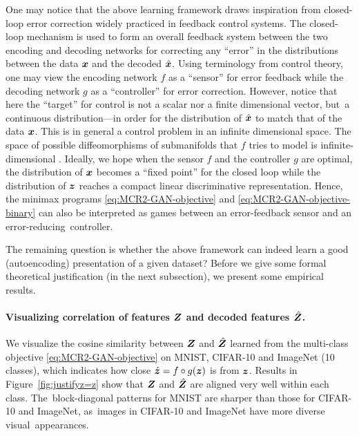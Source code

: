 \documentclass[../../book-main.tex]{subfiles}
\begin{document}
One may notice that the above learning framework draws inspiration from closed-loop error correction widely practiced in feedback control systems. The closed-loop mechanism is used to form an overall feedback system between the two encoding and decoding networks for correcting any  ``error'' in the distributions between the data $\bm{x}$ and the decoded $\hat {\bm{x}}$. Using terminology from control theory, one may view the encoding network $f$ as a ``sensor'' for error feedback while the decoding network $g$ as a ``controller'' for error correction. However, notice that here the ``target'' for control is not a scalar nor a finite dimensional vector, but~a continuous distribution---in order for the distribution of $\hat {\bm{x}}$ to match that of the data $\bm{x}$. This is in general a control problem in an infinite dimensional space. The space of possible diffeomorphisms of submanifolds that $f$ tries to model is infinite-dimensional \cite{Lee2002IntroductionTS}. Ideally, we hope when the sensor $f$ and the controller $g$ are optimal, the distribution of $\bm{x}$ becomes a ``fixed point'' for the closed loop while the distribution of $\bm{z}$ reaches a compact linear discriminative representation. Hence, the minimax programs \eqref{eq:MCR2-GAN-objective} and \eqref{eq:MCR2-GAN-objective-binary} can also be interpreted as games between an error-feedback sensor and an error-reducing~controller.

The remaining question is whether the above framework can indeed learn a good (autoencoding) presentation of a given dataset? Before we give some formal theoretical justification (in the next subsection), we present some empirical results. 

\paragraph{Visualizing correlation of features $\bm{Z}$ and decoded features $\hat {\bm{Z}}$.} We visualize the cosine similarity between $\bm{Z}$ and $\hat{\bm{Z}}$ learned from the multi-class objective \eqref{eq:MCR2-GAN-objective} on MNIST, CIFAR-10 and ImageNet (10 classes), which indicates how close $\hat{\bm{z}} = f\circ g(\bm{z})$ is from $\bm{z}$. Results in Figure~\ref{fig:justifyz=z} show that $\bm{Z}$ and $\hat{\bm{Z}}$ are aligned very well within each class. The~block-diagonal patterns for MNIST are sharper than those for CIFAR-10 and ImageNet, as~images in CIFAR-10 and ImageNet have more diverse visual~appearances.
\end{document}
